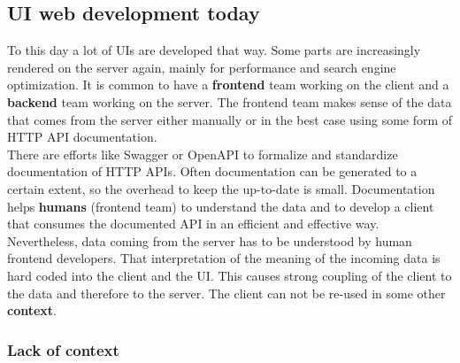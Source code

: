 \subsection{UI web development today}\label{uidevelopmenttoday}

To this day a lot of UIs are developed that way. Some parts are increasingly rendered on the server again, mainly for performance and search engine optimization. It is common to have a \textbf{frontend} team working on the client and a \textbf{backend} team working on the server. The frontend team makes sense of the data that comes from the server either manually or in the best case using some form of HTTP API documentation.
\\ There are efforts like Swagger or OpenAPI to formalize and standardize documentation of HTTP APIs. Often documentation can be generated to a certain extent, so the overhead to keep the up-to-date is small. Documentation helps \textbf{humans} (frontend team) to understand the data and to develop a client that consumes the documented API in an efficient and effective way.
\\ Nevertheless, data coming from the server has to be understood by human frontend developers. That interpretation of the meaning of the incoming data is hard coded into the client and the UI. This causes strong coupling of the client to the data and therefore to the server. The client can not be re-used in some other \textbf{context}.

\subsubsection{Lack of context}\label{datahumanmachine}

